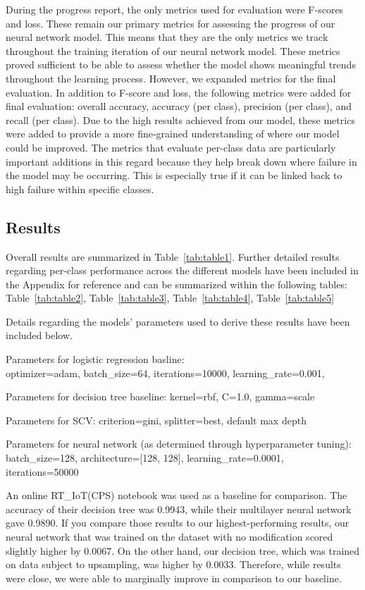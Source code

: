 \documentclass[11pt]{article}
\begin{document}
During the progress report, the only metrics used for evaluation were F-scores and loss. These remain our primary metrics for assessing the progress of our neural network model. This means that they are the only metrics we track throughout the training iteration of our neural network model. These metrics proved sufficient to be able to assess whether the model shows meaningful trends throughout the learning process. However, we expanded metrics for the final evaluation. In addition to F-score and loss, the following metrics were added for final evaluation: overall accuracy, accuracy (per class), precision (per class), and recall (per class). Due to the high results achieved from our model, these metrics were added to provide a more fine-grained understanding of where our model could be improved. The metrics that evaluate per-class data are particularly important additions in this regard because they help break down where failure in the model may be occurring. This is especially true if it can be linked back to high failure within specific classes.

\subsection{Results}
\label{sec:Results}

Overall results are summarized in Table~\ref{tab:table1}. Further detailed results regarding per-class performance across the different models have been included in the Appendix for reference and can be summarized within the following tables: Table~\ref{tab:table2}, Table~\ref{tab:table3}, Table~\ref{tab:table4}, Table~\ref{tab:table5}

Details regarding the models' parameters used to derive these results have been included below.

Parameters for logistic regression basline: \\
optimizer=adam, batch\_size=64, iterations=10000, learning\_rate=0.001, 

Parameters for decision tree baseline: 
kernel=rbf, C=1.0, gamma=scale

Parameters for SCV:
criterion=gini, splitter=best, default max depth

Parameters for neural network (as determined through hyperparameter tuning):
batch\_size=128, architecture=[128, 128], learning\_rate=0.0001, \\ iterations=50000

An online RT\_IoT(CPS) notebook \citep{ref13} was used as a baseline for comparison. The accuracy of their decision tree was 0.9943, while their multilayer neural network gave 0.9890. If you compare those results to our highest-performing results, our neural network that was trained on the dataset with no modification scored slightly higher by 0.0067. On the other hand, our decision tree, which was trained on data subject to upsampling, was higher by 0.0033. Therefore, while results were close, we were able to marginally improve in comparison to our baseline.
\end{document}
